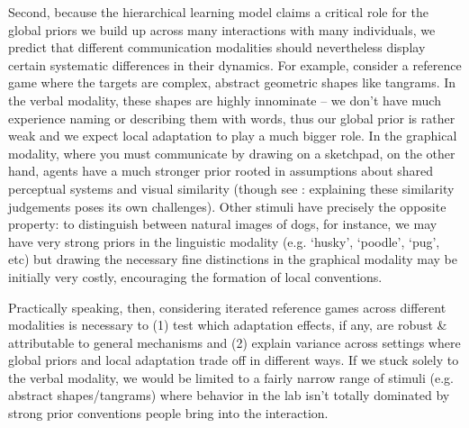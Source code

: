 \documentclass[11pt, floatsintext, jou]{apa6}
\begin{document}
Second, because the hierarchical learning model claims a critical role for the global priors we build up across many interactions with many individuals, we predict that different communication modalities should nevertheless display certain systematic differences in their dynamics. For example, consider a reference game where the targets are complex, abstract geometric shapes like tangrams. In the verbal modality, these shapes are highly innominate -- we don't have much experience naming or describing them with words, thus our global prior is rather weak and we expect local adaptation to play a much bigger role. In the graphical modality, where you must communicate by drawing on a sketchpad, on the other hand, agents have a much stronger prior rooted in assumptions about shared perceptual systems and visual similarity (though see : explaining these similarity judgements poses its own challenges). Other stimuli have precisely the opposite property: to distinguish between natural images of dogs, for instance, we may have very strong priors in the linguistic modality (e.g. `husky', `poodle', `pug', etc) but drawing the necessary fine distinctions in the graphical modality may be initially very costly, encouraging the formation of local conventions. 

Practically speaking, then, considering iterated reference games across different modalities is necessary to (1) test which adaptation effects, if any, are robust \& attributable to general mechanisms and (2) explain variance across settings where global priors and local adaptation trade off in different ways. If we stuck solely to the verbal modality, we would be limited to a fairly narrow range of stimuli (e.g. abstract shapes/tangrams) where behavior in the lab isn't totally dominated by strong prior conventions people bring into the interaction. 
\end{document}
